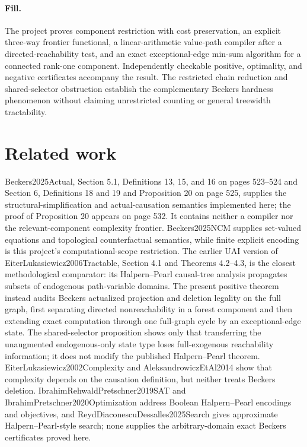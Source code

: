 \documentclass{article}
\begin{document}
\paragraph{Fill.} The project proves component restriction with cost preservation, an explicit three-way frontier functional, a linear-arithmetic value-path compiler after a directed-reachability test, and an exact exceptional-edge min-sum algorithm for a connected rank-one component. Independently checkable positive, optimality, and negative certificates accompany the result. The restricted chain reduction and shared-selector obstruction establish the complementary Beckers hardness phenomenon without claiming unrestricted counting or general treewidth tractability.

\section{Related work}

Beckers2025Actual, Section 5.1, Definitions 13, 15, and 16 on pages 523--524 and Section 6, Definitions 18 and 19 and Proposition 20 on page 525, supplies the structural-simplification and actual-causation semantics implemented here; the proof of Proposition 20 appears on page 532. It contains neither a compiler nor the relevant-component complexity frontier. Beckers2025NCM supplies set-valued equations and topological counterfactual semantics, while finite explicit encoding is this project's computational-scope restriction. The earlier UAI version of EiterLukasiewicz2006Tractable, Section 4.1 and Theorems 4.2--4.3, is the closest methodological comparator: its Halpern--Pearl causal-tree analysis propagates subsets of endogenous path-variable domains. The present positive theorem instead audits Beckers actualized projection and deletion legality on the full graph, first separating directed nonreachability in a forest component and then extending exact computation through one full-graph cycle by an exceptional-edge state. The shared-selector proposition shows only that transferring the unaugmented endogenous-only state type loses full-exogenous reachability information; it does not modify the published Halpern--Pearl theorem. EiterLukasiewicz2002Complexity and AleksandrowiczEtAl2014 show that complexity depends on the causation definition, but neither treats Beckers deletion. IbrahimRehwaldPretschner2019SAT and IbrahimPretschner2020Optimization address Boolean Halpern--Pearl encodings and objectives, and ReydDiaconescuDessalles2025Search gives approximate Halpern--Pearl-style search; none supplies the arbitrary-domain exact Beckers certificates proved here.
\end{document}
